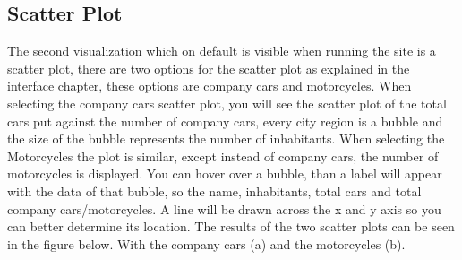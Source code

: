\documentclass[a4paper,twoside,11pt]{article}
\begin{document}
\subsection{Scatter Plot}
The second visualization which on default is visible when running the site is a scatter plot, there are two options for the scatter plot as explained in the interface chapter, these options are company cars and motorcycles. \newline
When selecting the company cars scatter plot, you will see the scatter plot of the total cars put against the number of company cars, every city region is a bubble and the size of the bubble represents the number of inhabitants. When selecting the Motorcycles the plot is similar, except instead of company cars, the number of motorcycles is displayed. You can hover over a bubble, than a label will appear with the data of that bubble, so the name, inhabitants, total cars and total company cars/motorcycles. A line will be drawn across the x and y axis so you can better determine its location. \newline
The results of the two scatter plots can be seen in the figure below. With the company cars (a) and the motorcycles (b). \newline
\end{document}

